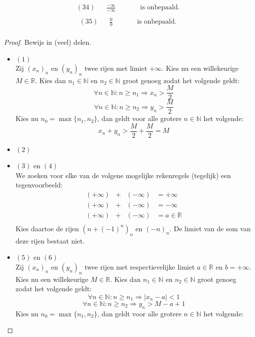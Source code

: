 \documentclass[main.tex]{subfiles}
\begin{document}
\begin{bst}
\[\begin{array}{crccccl}
    (34) &                          & \frac{-\infty}{-\infty} &&&& \text{ is onbepaald.}\\
  \end{array}
  \]
  \[
  \begin{array}{crccccl}
    (35) &                          & \frac{0}{0}             &&&& \text{ is onbepaald.}\\
  \end{array}
  \]
  \begin{proof}
    Bewijs in (veel) delen.
    \begin{itemize}
    \item $(1)$\\
      Zij $(x_{n})_{n}$ en $(y_{n})_{n}$ twee rijen met limiet $+\infty$.
      Kies nu een willekeurige $M\in \mathbb{R}$.
      Kies dan $n_{1}\in \mathbb{N}$ en $n_{2}\in \mathbb{N}$ groot genoeg zodat het volgende geldt:
      \[ \forall n\in \mathbb{N}: n \ge n_{1} \Rightarrow x_{n}>\frac{M}{2} \]
      \[ \forall n\in \mathbb{N}: n \ge n_{2} \Rightarrow y_{n}>\frac{M}{2} \]
      Kies nu $n_{0} = \max\{n_{1},n_{2}\}$, dan geldt voor alle grotere $n\in\mathbb{N}$ het volgende:
      \[ x_{n}+y_{n} > \frac{M}{2}+\frac{M}{2} = M \]
    \item $(2)$ 
    \item $(3)$ en $(4)$\\
      We zoeken voor elke van de volgene mogelijke rekenregels (tegelijk) een tegenvoorbeeld:
      \[ 
      \begin{array}{cccc}
        (+\infty) &+& (-\infty) &= +\infty\\
        (+\infty) &+& (-\infty) &= -\infty\\
        (+\infty) &+& (-\infty) &= a \in \mathbb{R}\\
      \end{array}
      \]
      Kies daartoe de rijen $(n+(-1)^{n})_{n}$ en $(-n)_{n}$.
      De limiet van de som van deze rijen bestaat niet.
    \item $(5)$ en $(6)$\\
      Zij $(x_{n})_{n}$ en $(y_{n})_{n}$ twee rijen met respectievelijke limiet $a\in \mathbb{R}$ en $b = +\infty$.
      Kies nu een willekeurige $M \in \mathbb{R}$.
      Kies dan $n_{1}\in \mathbb{N}$ en $n_{2}\in \mathbb{N}$ groot genoeg zodat het volgende geldt:
      \[ \forall n\in \mathbb{N}: n \ge n_{1} \Rightarrow |x_{n}-a| < 1 \]
      \[ \forall n\in \mathbb{N}: n \ge n_{2} \Rightarrow y_{n} > M-a+1 \]
      Kies nu $n_{0} = \max\{n_{1},n_{2}\}$, dan geldt voor alle grotere $n\in\mathbb{N}$ het volgende:

\end{itemize}
\end{proof}
\end{bst}
\end{document}
